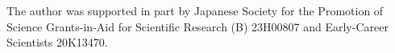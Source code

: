 \documentclass[aop]{imsart}
\theoremstyle{plain}
\theoremstyle{remark}
\begin{document}










\newpage 

\begin{funding}
The author was supported in part by Japanese Society for the Promotion of Science Grants-in-Aid for Scientific Research (B) 23H00807 and Early-Career Scientists 20K13470. 
\end{funding}

\end{document}
